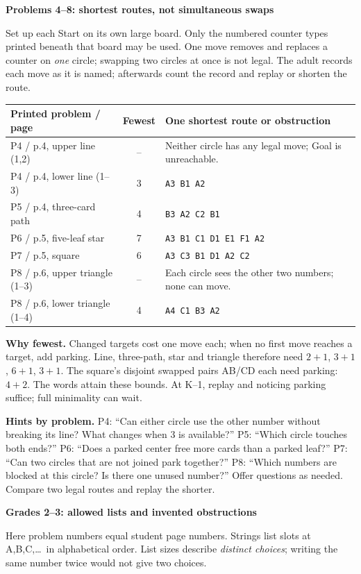 \documentclass[10pt]{article}
\newcommand{\head}[1]{\par{\large\bfseries #1}\par}
\newcommand{\sub}[1]{\par\textbf{#1}\par}
\newcommand{\word}[1]{\texttt{#1}}
\begin{document}
\sub{Problems 4--8: shortest routes, not simultaneous swaps}
Set up each Start on its own large board. Only the numbered counter types printed beneath that board may be used. One move removes and replaces a counter on \emph{one} circle; swapping two circles at once is not legal. The adult records each move as it is named; afterwards count the record and replay or shorten the route.
\begin{center}\renewcommand{\arraystretch}{1.25}
\begin{tabular}{p{.25\linewidth}c p{.57\linewidth}}
Printed problem / page & Fewest & One shortest route or obstruction\\\midrule
P4 / p.4, upper line (1,2) & -- & Neither circle has any legal move; Goal is unreachable.\\
P4 / p.4, lower line (1--3) & 3 & \word{A3 B1 A2}\\
P5 / p.4, three-card path & 4 & \word{B3 A2 C2 B1}\\
P6 / p.5, five-leaf star & 7 & \word{A3 B1 C1 D1 E1 F1 A2}\\
P7 / p.5, square & 6 & \word{A3 C3 B1 D1 A2 C2}\\
P8 / p.6, upper triangle (1--3) & -- & Each circle sees the other two numbers; none can move.\\
P8 / p.6, lower triangle (1--4) & 4 & \word{A4 C1 B3 A2}\\
\end{tabular}\end{center}
\textbf{Why fewest.} Changed targets cost one move each; when no first move reaches a target, add parking. Line, three-path, star and triangle therefore need $2+1$, $3+1$, $6+1$, $3+1$. The square's disjoint swapped pairs AB/CD each need parking: $4+2$. The words attain these bounds. At K--1, replay and noticing parking suffice; full minimality can wait.

\textbf{Hints by problem.} P4: ``Can either circle use the other number without breaking its line? What changes when 3 is available?'' P5: ``Which circle touches both ends?'' P6: ``Does a parked center free more cards than a parked leaf?'' P7: ``Can two circles that are not joined park together?'' P8: ``Which numbers are blocked at this circle? Is there one unused number?'' Offer questions as needed. Compare two legal routes and replay the shorter.
\newpage
\head{Grades 2--3: allowed lists and invented obstructions}
Here problem numbers equal student page numbers. Strings list slots at A,B,C,\ldots\ in alphabetical order. List sizes describe \emph{distinct choices}; writing the same number twice would not give two choices.
\end{document}
